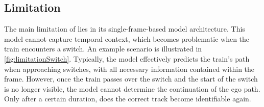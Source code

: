 \subsection{Limitation}

The main limitation of \cite{tepNet2024} lies in its single-frame-based model architecture.
This model cannot capture temporal context, which becomes problematic when the train encounters a switch.
An example scenario is illustrated in \autoref{fig:limitationSwitch}.
Typically, the model effectively predicts the train's path when approaching switches, with all necessary information contained within the frame.
However, once the train passes over the switch and the start of the switch is no longer visible, the model cannot determine the continuation of the ego path.
Only after a certain duration, does the correct track become identifiable again.

